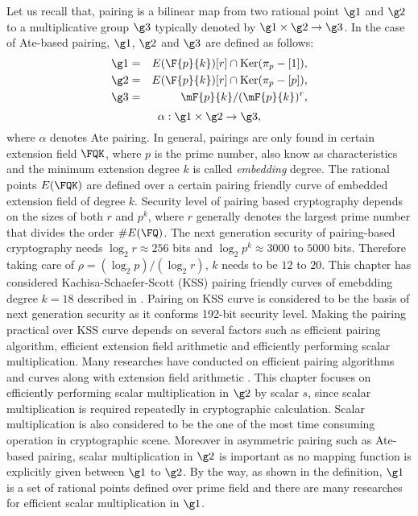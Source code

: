 Let us recall that, pairing is a bilinear map from two rational point  $\g1$ and $\g2$ to a multiplicative group $\g3$ \cite{Silverman} typically denoted by $\g1 \times \g2 \rightarrow \g3$.
In the case of Ate-based pairing, $\g1$, $\g2$ and $\g3$ are defined as follows:
\begin{eqnarray}\label{eq:g_1}
\g1 & = &  E(\F{p}{k}) [r] \cap \text{Ker}(\pi_p - [1]), \nonumber \\
\g2 & = &  E(\F{p}{k}) [r] \cap \text{Ker}(\pi_p - [p]), \nonumber \\
\g3 & = & \mF{p}{k}/(\mF{p}{k})^r, \nonumber
\end{eqnarray}
\begin{equation}
\alpha : \g1 \times \g2 \rightarrow \g3,  \nonumber
\end{equation}
where $\alpha$ denotes Ate pairing.
In general, pairings are only found in certain extension field $\FQK$, where $p$ is the prime number, also know as characteristics  and the minimum extension degree $k$ is called \textit{embedding} degree. 
The rational points $E(\FQK)$ are defined over a certain pairing friendly curve of embedded extension field of degree $k$.
Security level of pairing based cryptography depends on the sizes of both $r$ and $p^k$, where $r$ generally denotes the largest prime number that divides the order $\#E(\FQ)$.
The next generation security of pairing-based cryptography needs $\log_2 r \approx 256$ bits and $\log_2 p^k \approx 3000$ to $5000$ bits. 
Therefore taking care of $\rho = (\log_2 p)/(\log_2 r)$, $k$ needs to be $12$ to $20$. 
This chapter has considered Kachisa-Schaefer-Scott (KSS) \cite{EPRINT:KacSchSco07} pairing friendly curves of emebdding degree $k=18$ described in \cite{EPRINT:FreScoTes06}. 
Pairing on KSS curve is considered to be the basis of next generation security as it conforms 192-bit security level. 
Making the pairing practical over KSS curve depends on several factors such as efficient pairing algorithm, efficient extension field arithmetic and efficiently performing scalar multiplication. 
Many researches have conducted on efficient pairing algorithms \cite{C:BKLS02} and curves \cite{SCN:BarLynSco02} along with extension field arithmetic \cite{C:BaiPaa98}. 
This chapter focuses on efficiently performing scalar multiplication in $\g2$ by scalar $s$, since scalar multiplication is required repeatedly in cryptographic calculation. Scalar multiplication is also considered to be the one of the most time consuming operation in cryptographic scene. Moreover in asymmetric pairing such as Ate-based pairing, scalar multiplication in $\g2$ is important as no mapping function is explicitly given between $\g1$ to $\g2$.
By the way, as shown in the definition, $\g1$ is a set of rational points defined over prime field and there are many researches for efficient scalar multiplication in $\g1$.

